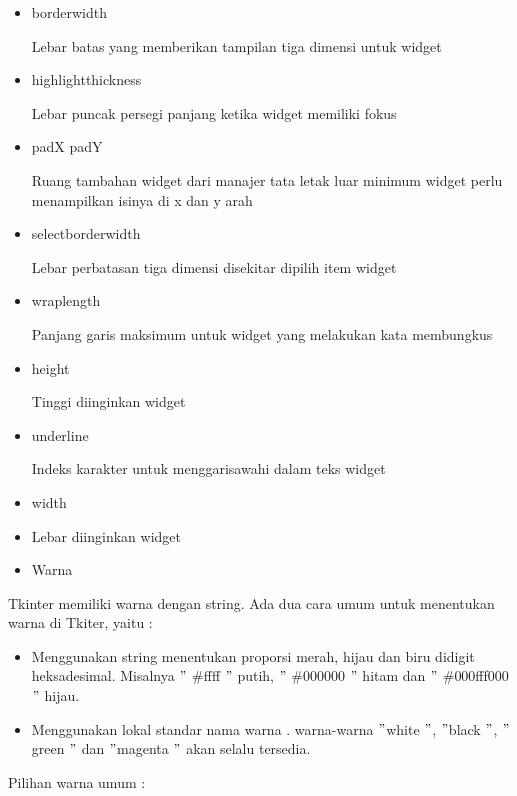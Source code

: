 \begin{itemize}
\item borderwidth 

Lebar batas yang memberikan tampilan tiga dimensi untuk widget 
\item highlightthickness 

Lebar puncak persegi panjang ketika widget memiliki fokus 
\item padX padY 

Ruang tambahan widget dari manajer tata letak luar minimum widget perlu menampilkan isinya di x dan y arah 
\item selectborderwidth 

Lebar perbatasan tiga dimensi disekitar dipilih item widget 
\item wraplength 

Panjang garis maksimum untuk widget yang melakukan kata membungkus 
\item height 

Tinggi diinginkan widget 
\item underline 

Indeks karakter untuk menggarisawahi dalam teks widget  
\item width 
 
\item Lebar diinginkan widget

\item Warna 
\end{itemize}
\vspace{12pt}
 
\hspace*{0.5in} Tkinter memiliki warna dengan string. Ada dua cara umum untuk menentukan warna di Tkiter, yaitu : 
 
\begin{itemize}
\item Menggunakan string menentukan proporsi merah, hijau dan biru didigit heksadesimal. Misalnya  $ " $ $  \#  $ffff $ " $ putih,  $ " $ $  \#  $000000 $ " $ hitam dan  $ " $ $  \#  $000fff000 $ " $ hijau. 
 
\item Menggunakan lokal standar nama warna . warna-warna  $ " $white $ " $, $ " $black $ " $,  $ " $green $ " $ dan  $ " $magenta $ " $ akan selalu tersedia.\end{itemize}
 
\vspace{12pt}
Pilihan warna umum : 
 
